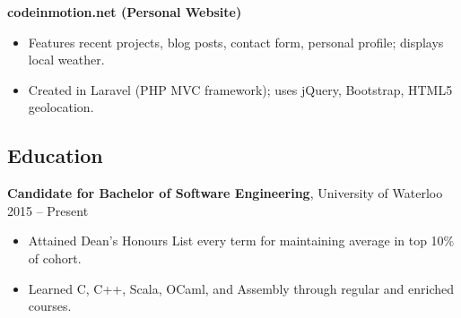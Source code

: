 \documentclass[]{article}
\begin{document}
\textbf{codeinmotion.net (Personal Website)}

\begin{itemize}
\item
  Features recent projects, blog posts, contact form, personal profile;
  displays local weather.
\item
  Created in Laravel (PHP MVC framework); uses jQuery, Bootstrap, HTML5
  geolocation.
\end{itemize}

\subsection{Education}

\textbf{Candidate for Bachelor of Software Engineering}, University of
Waterloo 2015 -- Present

\begin{itemize}
\item
  Attained Dean's Honours List every term for maintaining average in top
  10\% of cohort.
\item
  Learned C, C++, Scala, OCaml, and Assembly through regular and
  enriched courses.
\end{itemize}
\end{document}
